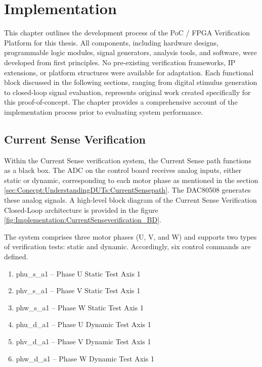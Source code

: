 
\chapter{Implementation}
\label{ch:chapter03}

This chapter outlines the development process of the \acs{PoC} / \acs{FPGA} Verification Platform for this thesis. All components, including hardware designs, programmable logic modules, signal generators, analysis tools, and software, were developed from first principles. No pre-existing verification frameworks, \acs{IP} extensions, or platform structures were available for adaptation. Each functional block discussed in the following sections, ranging from digital stimulus generation to closed-loop signal evaluation, represents original work created specifically for this proof-of-concept. The chapter provides a comprehensive account of the implementation process prior to evaluating system performance.

\section{Current Sense Verification}
\label{sec:Implementation:Current_Sense_Verification}

Within the Current Sense verification system, the Current Sense path functions as a black box. The \acs{ADC} on the control board receives analog inputs, either static or dynamic, corresponding to each motor phase as mentioned in the section \ref{sec:Conecpt:UnderstandingDUTs:CurrentSensepath}. The DAC80508 generates these analog signals. A high-level block diagram of the Current Sense Verification Closed-Loop architecture is provided in the figure \ref{fig:Implementation:CurrentSenseverification_BD}.

The system comprises three motor phases (U, V, and W) and supports two types of verification tests: static and dynamic. Accordingly, six control commands are defined.

\begin{enumerate}
	\item phu\_s\_a1 – Phase U Static Test Axis 1
	\item phv\_s\_a1 – Phase V Static Test Axis 1
	\item phw\_s\_a1 – Phase W Static Test Axis 1
	\item phu\_d\_a1 – Phase U Dynamic Test Axis 1
	\item phv\_d\_a1 – Phase V Dynamic Test Axis 1
	\item phw\_d\_a1 – Phase W Dynamic Test Axis 1
\end{enumerate}

